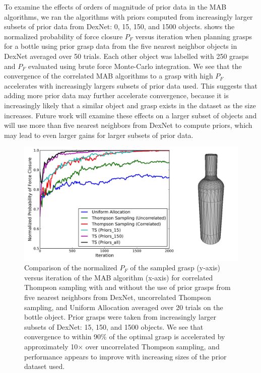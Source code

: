 To examine the effects of orders of magnitude of prior data in the MAB algorithms, we ran the algorithms with priors computed from increasingly larger subsets of prior data from DexNet: 0, 15, 150, and 1500 objects. 
 shows the normalized probability of force closure $P_F$ versus iteration when planning grasps for a bottle using prior grasp data from the five nearest neighbor objects in DexNet averaged over 50 trials.
Each other object was labelled with 250 grasps and $P_F$ evaluated using brute force Monte-Carlo integration.
We see that the convergence of the correlated MAB algorithms to a grasp with high $P_F$ accelerates with increasingly largers subsets of prior data used.
This suggests that adding more prior data may further accelerate convergence, because it is increasingly likely that a similar object and grasp exists in the dataset as the size increases.
Future work will examine these effects on a larger subset of objects and will use more than five nearest neighbors from DexNet to compute priors, which may lead to even larger gains for larger subsets of prior data.

\begin{figure}[t!]
\centering
\includegraphics[scale=0.09]{figures/bottle_avg_reward_w_model2.jpg}
\caption{Comparison of the normalized $P_F$ of the sampled grasp (y-axis) versus iteration of the MAB algorithm (x-axis) for correlated Thompson sampling with and without the use of prior grasps from five nearest neighbors from DexNet, uncorrelated Thompson sampling, and Uniform Allocation averaged over 20 trials on the bottle object. Prior grasps were taken from increasingly larger subsets of DexNet: 15, 150, and 1500 objects. We see that convergence to within 90\% of the optimal grasp is accelerated by approximately 10$\times$ over uncorrelated Thompson sampling, and performance appears to improve with increasing sizes of the prior dataset used. }
\vspace*{-15pt}
\end{figure}

